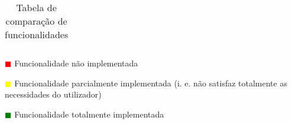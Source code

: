 \begin{table}[!ht]
\begin{center}
\begin{tabular}{|p{3cm}|p{0cm}|p{0cm}|p{0cm}|p{0cm}|p{0cm}|}
		\end{tabular}
	\end{center}
	\hspace{1.2cm}	\textcolor{red}{$\blacksquare$} Funcionalidade não implementada
	
	\hspace{1.2cm}     \textcolor{yellow}{$\blacksquare$} Funcionalidade parcialmente implementada (i. e. não satisfaz totalmente as necessidades do utilizador)
	
	\hspace{1.2cm}     \textcolor{green}{$\blacksquare$} Funcionalidade totalmente implementada 
	\begin{center}
		\caption{Tabela de comparação de funcionalidades}
		\label{tab:comparacao1}
	\end{center}
\end{table}

\newpage

